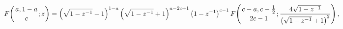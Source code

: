 \[\mathop{F\/}\nolimits\!\left({a,1-a\atop c};z\right)=\left(\sqrt{1-z^{-1}}-1%
\right)^{1-a}\left(\sqrt{1-z^{-1}}+1\right)^{a-2c+1}\left(1-z^{-1}\right)^{c-1%
}\mathop{F\/}\nolimits\!\left({c-a,c-\tfrac{1}{2}\atop 2c-1};\frac{4\sqrt{1-z^%
{-1}}}{\left(\sqrt{1-z^{-1}}+1\right)^{2}}\right),\]